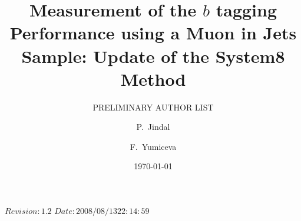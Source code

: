 \RCS$Revision: 1.2 $
\RCS$Date: 2008/08/13 22:14:59 $

 
\def\bb{$b\overline{b}\;$}
\def\cc{$c\overline{c}\;$}
\def\ttbar{$t\overline{t}\;$}
\def\mttbar{$m_{t\overline{t}}\;$}
\def\Zp{${Z'}\;$}
\def\ddZ{$\mathrm{d}\overline{\mathrm{d}}$}
\def\ss{$\mathrm{s}\overline{\mathrm{s}}\;$}
\def\ssZ{$\mathrm{s}\overline{\mathrm{s}}$}
\def\zqq{$\mathrm{Z} \rightarrow \mathrm{q}\overline{\mathrm{q}}\;$}
\def\zcc{$\mathrm{Z} \rightarrow \mathrm{c}\overline{\mathrm{c}}\;$}
\def\zbb{$\mathrm{Z} \rightarrow \mathrm{b}\overline{\mathrm{b}}\;$}
\def\zuuZ{$\mathrm{Z} \rightarrow \mathrm{u}\overline{\mathrm{u}}$}
\def\gevc{~GeV/$c\;$}
\def\gevcc{~GeV/$c^{2}\;$}
\def\mum{~$\mu$m$\;$}
\def\pt{$p_T\;$}
\def\ptZ{$p_T$}
\def\Et{$E_T\;$}
\def\EtZ{$E_T$}
\def\ip{$IP\;$}
\def\ipZ{$IP$}
\def\dca{$dca\;$}
\def\prob{${\cal P}_{jet}\;$}
\def\probZ{${\cal P}_{jet}$}
\def\dr{$\Delta R\;$}
\def\pscat{$p_{scat}\;$}
\def\pscatZ{$p_{scat}$}
\def\sip{${\cal S}_{IP}\;$}
\def\ptrel{$p_{Trel}\;$}
\def\tag{${\cal P}_{jet}^+<$}

\title{\bf Measurement of the $b$ tagging Performance using a Muon in Jets Sample: Update of the System8 Method}

\author[fnal]{PRELIMINARY AUTHOR LIST}
\author[purdue]{P.~Jindal}
\author[fnal]{F.~Yumiceva}
\address[fnal]{Fermi National Accelerator Laboratory, Batavia, Illinois USA}  
\address[purdue]{Purdue University Calumet, Hammond, Indiana, USA}
\date{\today}
  



\maketitle %

